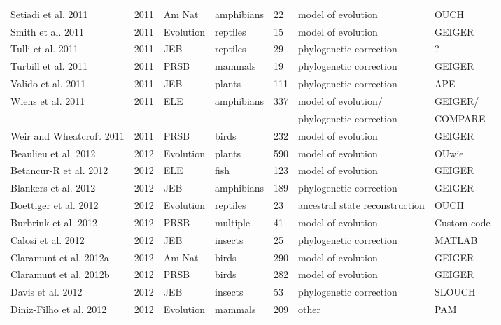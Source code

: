 \begin{landscape}
\begin{center}
\begin{longtable}{p{6cm}llllll}
Setiadi et al. 2011   &   2011    &   Am Nat  &   amphibians  &   22  &   model of evolution  &   OUCH    \\
Smith et al. 2011 &   2011    &   Evolution   &   reptiles    &   15  &   model of evolution  &   GEIGER  \\
Tulli et al. 2011 &   2011    &   JEB &   reptiles    &   29  &   phylogenetic correction &   ?   \\
Turbill et al. 2011   &   2011    &   PRSB    &   mammals &   19  &   phylogenetic correction &   GEIGER  \\
Valido et al. 2011    &   2011    &   JEB &   plants  &   111 &   phylogenetic correction &   APE \\
Wiens et al. 2011 &   2011    &   ELE &   amphibians  &   337 &   model of evolution/ &   GEIGER/ \\
    &       &       &       &       &   phylogenetic correction &   COMPARE \\
Weir and Wheatcroft 2011  &   2011    &   PRSB    &   birds   &   232 &   model of evolution  &   GEIGER  \\
Beaulieu et al. 2012  &   2012    &   Evolution   &   plants  &   590 &   model of evolution  &   OUwie   \\
Betancur-R et al. 2012    &   2012    &   ELE &   fish    &   123 &   model of evolution  &   GEIGER  \\
Blankers et al. 2012  &   2012    &   JEB &   amphibians  &   189 &   phylogenetic correction &   GEIGER  \\
Boettiger et al. 2012 &   2012    &   Evolution   &   reptiles    &   23  &   ancestral state reconstruction  &   OUCH    \\
Burbrink et al. 2012  &   2012    &   PRSB    &   multiple    &   41  &   model of evolution  &   Custom code \\
Calosi et al. 2012    &   2012    &   JEB &   insects &   25  &   phylogenetic correction &   MATLAB  \\
Claramunt et al. 2012a    &   2012    &   Am Nat  &   birds   &   290 &   model of evolution  &   GEIGER  \\
Claramunt et al. 2012b    &   2012    &   PRSB    &   birds   &   282 &   model of evolution  &   GEIGER  \\
Davis et al. 2012 &   2012    &   JEB &   insects &   53  &   phylogenetic correction &   SLOUCH  \\
Diniz-Filho et al. 2012   &   2012    &   Evolution   &   mammals &   209 &   other   &   PAM \\

\end{longtable}
\end{center}
\end{landscape}
